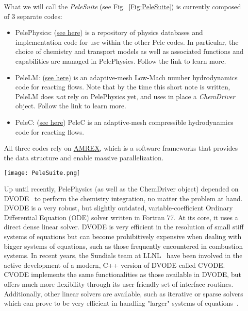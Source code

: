 \documentclass[12pt]{article}
\begin{document}
What we will call the \textit{PeleSuite} (see Fig.~\ref{Fig:PeleSuite}) is currently composed of 3 separate codes:
\begin{itemize}
\item PelePhysics: (\href{https://github.com/AMReX-Combustion/PelePhysics}{see here}) is a repository of physics databases and implementation code for use within the other Pele codes. In particular, the choice of chemistry and transport models as well as associated functions and capabilities are managed in PelePhysics. Follow the link to learn more.
\item PeleLM: (\href{https://github.com/AMReX-Combustion/PeleLM}{see here}) is an adaptive-mesh Low-Mach number hydrodynamics code for reacting flows. Note that by the time this short note is written, PeleLM does \textit{not} rely on PelePhysics yet, and uses in place a \textit{ChemDriver} object. Follow the link to learn more.
\item PeleC: (\href{https://github.com/AMReX-Combustion/PeleC}{see here}) PeleC is an adaptive-mesh compressible hydrodynamics code for reacting flows.
\end{itemize} 
All three codes rely on \href{https://amrex-codes.github.io/amrex/}{AMREX}, which is a software frameworks that provides the data structure and enable massive parallelization.

\begin{figure*}[http]
\centering
\texttt{[image: PeleSuite.png]}
\label{Fig:PeleSuite}
\end{figure*}



Up until recently, PelePhysics (as well as the ChemDriver object) depended on DVODE~\cite{VODE:1989} to perform the chemistry integration, no matter the problem at hand. DVODE is a very robust, but slightly outdated, variable-coefficient Ordinary Differential Equation (ODE) solver written in Fortran 77. At its core, it uses a direct dense linear solver. DVODE is very efficient in the resolution of small stiff systems of equations but can become prohibitively expensive when dealing with bigger systems of equations, such as those frequently encountered in combustion systems. In recent years, the Sundials team at LLNL~\cite{hindmarsh2005sundials,cohen1996cvode} have been involved in the active development of a modern, C++ version of DVODE called CVODE. CVODE implements the same functionalities as those available in DVODE, but offers much more flexibility through its user-friendly set of interface routines. Additionally, other linear solvers are available, such as iterative or sparse solvers which can prove to be very efficient in handling "larger" systems of equations~\cite{perini2014study}.
\end{document}
